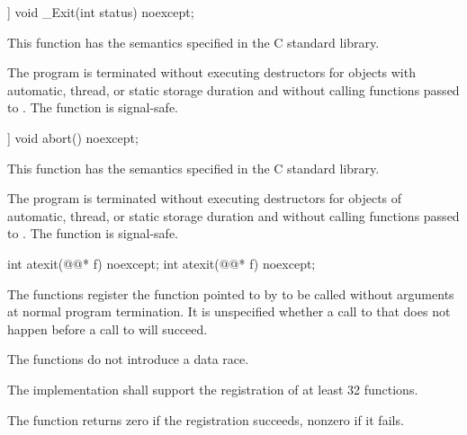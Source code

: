 %
\begin{itemdecl}
[[noreturn]] void _Exit(int status) noexcept;
\end{itemdecl}

\begin{itemdescr}
\pnum
\effects
This function has the semantics specified in the C standard library.

\pnum
\remarks
The program is terminated without executing destructors for objects with automatic,
thread, or static storage duration and without calling functions passed to
.
%
The function  is signal-safe.
\end{itemdescr}

%
\begin{itemdecl}
[[noreturn]] void abort() noexcept;
\end{itemdecl}

\begin{itemdescr}
\pnum
\effects
This function has the semantics specified in the C standard library.

\pnum
\remarks
The program is terminated without executing destructors for objects of
automatic, thread, or static storage
duration and without calling functions passed to
.
%
The function  is signal-safe.
\end{itemdescr}

%
\begin{itemdecl}
int atexit(@@* f) noexcept;
int atexit(@@* f) noexcept;
\end{itemdecl}

\begin{itemdescr}
\pnum
\effects
The
functions register the function pointed to by 
to be called without arguments at normal program termination.
It is unspecified whether a call to  that does not
happen before a call to  will succeed.
\begin{note}
The  functions do not introduce a data
race.
\end{note}

\pnum
\implimits
The implementation shall support the registration of at least 32 functions.

\pnum
\returns
The
function returns zero if the registration succeeds,
nonzero if it fails.
\end{itemdescr}

